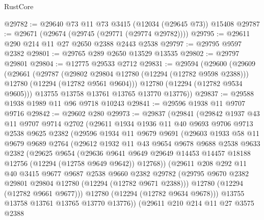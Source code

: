 \begin{lexlean}{RustCore}
\begin{coremodule}
@29782 := @29640 @73 @11 @73 @3415 (@12034 (@29645 @73)) @15408
@29787 := @29671 (@29674 (@29745 (@29771 (@29774 @29782))))
@29795 := @29611 @290 @214 @11 @27 @2650 @2388 @2443 @2538
@29797 := @29795 @9597 @2382
@29801 := @29765 @289 @2650 @13529 @13535
@29802 := @29797 @29801
@29804 := @12775 @29533 @2712
@29831 := @29594
    (@29600
      (@29609
        (@29661
          (@29787
            (@29802 @29804 @12780 (@12294 (@12782 @9598 @2388)))
            @12780
            (@12294 (@12782 @9561 @9604)))
          @12780
          (@12294 (@12782 @9534 @9605)))
        @13755
        @13758
        @13761
        @13765
        @13770
        @13776))
@29837 := @29588 @1938 @1989 @11 @96 @9718 @10243
@29841 := @29596 @1938 @11 @9707 @9716
@29842 := @29602 @280
@29973 := @29837
    (@29841
      (@29842
        @1937
        @43
        @11
        @9707
        @9714
        @2702
        (@29611
          @1934
          @1936
          @11
          @40
          @9693
          @9706
          @9713
          @2538
          @9625
          @2382
          (@29596
            @1934
            @11
            @9679
            @9691
            (@29603
              @1933
              @58
              @11
              @9679
              @9689
              @2764
              (@29612
                @1932
                @11
                @43
                @9654
                @9678
                @9688
                @2538
                @9633
                @2382
                (@29625
                  @9654
                  (@29636
                    @9641
                    @9649
                    @29649
                    @14453
                    @14457
                    @18188
                    @12756
                    (@12294 (@12758 @9649 @9642))
                    @12768))
                (@29611
                  @208
                  @292
                  @11
                  @40
                  @3415
                  @9677
                  @9687
                  @2538
                  @9660
                  @2382
                  @29782
                  (@29795 @9670 @2382 @29801 @29804 @12780 (@12294 (@12782 @9671 @2388)))
                  @12780
                  (@12294 (@12782 @9661 @9677)))
                @12780
                (@12294 (@12782 @9634 @9678)))
              @13755
              @13758
              @13761
              @13765
              @13770
              @13776))
          (@29611
            @210
            @214
            @11
            @27
            @3575
            @2388

\end{coremodule}
\end{lexlean}
